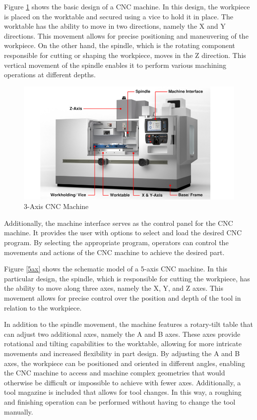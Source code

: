Figure \ref{3ax} shows the basic design of a CNC machine. In this design, the workpiece is placed on the worktable and secured using a vice to hold it in place. The worktable has the ability to move in two directions, namely the X and Y directions. This movement allows for precise positioning and maneuvering of the workpiece. On the other hand, the spindle, which is the rotating component responsible for cutting or shaping the workpiece, moves in the Z direction. This vertical movement of the spindle enables it to perform various machining operations at different depths.



 
\begin{figure}[H]
	\centerline{\includegraphics[scale=.6]{figures/basicCNC.jpg}}
	\caption{3-Axis CNC Machine~\cite{3ax}}
	\label{3ax}
\end{figure}

Additionally, the machine interface serves as the control panel for the CNC machine. It provides the user with options to select and load the desired CNC program. By selecting the appropriate program, operators can control the movements and actions of the CNC machine to achieve the desired part.


Figure \ref{5ax} shows the schematic model of a 5-axis CNC machine. In this particular design, the spindle, which is responsible for cutting the workpiece, has the ability to move along three axes, namely the X, Y, and Z axes. This movement allows for precise control over the position and depth of the tool in relation to the workpiece.

In addition to the spindle movement, the machine features a rotary-tilt table that can adjust two additional axes, namely the A and B axes. These axes provide rotational and tilting capabilities to the worktable, allowing for more intricate movements and increased flexibility in part design. By adjusting the A and B axes, the workpiece can be positioned and oriented in different angles, enabling the CNC machine to access and machine complex geometries that would otherwise be difficult or impossible to achieve with fewer axes. Additionally, a tool magazine is included that allows for tool changes. In this way, a roughing and finishing operation can be performed without having to change the tool manually.

